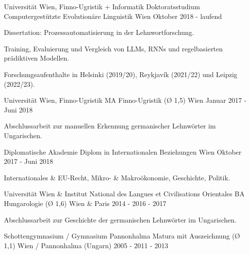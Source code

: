 

\begin{cventries}

  \cventry
    {Universität Wien, Finno-Ugristik + Informatik} %
    {Doktoratsstudium Computergestützte Evolutionäre Linguistik} %
    {Wien} %
    {Oktober 2018 - laufend} %
    {
      \begin{cvitems} %
        \item{Dissertation: Prozessautomatisierung in der Lehnwortforschung.}
        \item{Training, Evaluierung und Vergleich von LLMs, RNNs und regelbasierten prädiktiven Modellen.}
        \item{Forschungsaufenthalte in Helsinki (2019/20), Reykjavík (2021/22) und Leipzig (2022/23).}
      \end{cvitems}
    }

  \cventry
    {Universität Wien, Finno-Ugristik} %
    {MA Finno-Ugristik (Ø 1,5)} %
    {Wien} %
    {Januar 2017 - Juni 2018} %
    {
      \begin{cvitems} %
        \item {Abschlussarbeit zur manuellen Erkennung germanischer Lehnwörter im Ungarischen.}
      \end{cvitems}
    }

  \cventry
    {Diplomatische Akademie} %
    {Diplom in Internationalen Beziehungen} %
    {Wien} %
    {Oktober 2017 - Juni 2018} %
    {
    \begin{cvitems} %
        \item{Internationales \& EU-Recht, Mikro- \& Makroökonomie, Geschichte, Politik.}
      \end{cvitems}
    }
    
  \cventry
    {Universität Wien \& Institut National des Langues et Civilisations Orientales} %
    {BA Hungarologie (Ø 1,6)} %
    {Wien \& Paris} %
    {2014 - 2016 - 2017} %
    {
      \begin{cvitems} %
        \item {Abschlussarbeit zur Geschichte der germanischen Lehnwörter im Ungarischen.}
      \end{cvitems}
    }
        
  \cventry
    {Schottengymnasium / Gymnasium Pannonhalma} %
    {Matura mit Auszeichnung (Ø 1,1)} %
    {Wien / Pannonhalma (Ungarn)} %
    {2005 - 2011 - 2013} %
    {}
\end{cventries}
